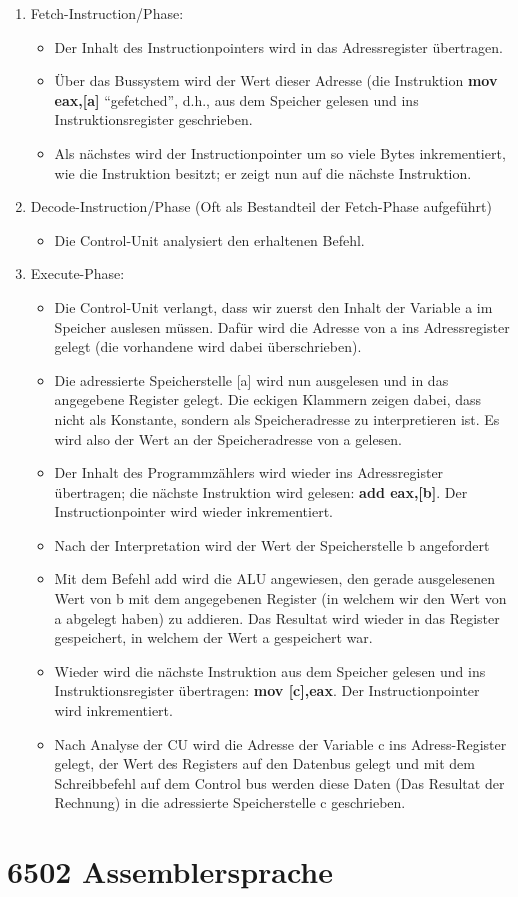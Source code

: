 \documentclass[a4paper,10pt]{report}
\begin{document}
\begin{enumerate}
	\item Fetch-Instruction/Phase:
	\begin{itemize}
		\item	Der Inhalt des Instructionpointers wird in das Adressregister übertragen. 
		\item Über das Bussystem wird der Wert dieser Adresse (die Instruktion \textbf{mov eax,[a]} "`gefetched"', d.h., aus dem Speicher gelesen und ins Instruktionsregister geschrieben.
		\item Als nächstes wird der Instructionpointer um so viele Bytes inkrementiert, wie die Instruktion besitzt; er zeigt nun auf die nächste Instruktion.
	\end{itemize}
 \item Decode-Instruction/Phase (Oft als Bestandteil der Fetch-Phase aufgeführt)
  \begin{itemize}	
		\item Die Control-Unit analysiert den erhaltenen Befehl.
	\end{itemize}
	\item Execute-Phase:
	\begin{itemize}	
		\item Die Control-Unit verlangt, dass wir zuerst den Inhalt der Variable a im Speicher auslesen müssen. Dafür wird die Adresse von a ins Adressregister gelegt (die vorhandene wird dabei überschrieben). 
		\item Die adressierte Speicherstelle [a] wird nun ausgelesen und in das angegebene Register gelegt. Die eckigen Klammern zeigen dabei, dass nicht als Konstante, sondern als Speicheradresse zu interpretieren ist. Es wird also der Wert an der Speicheradresse von a gelesen.
		\item Der Inhalt des Programmzählers wird wieder ins Adressregister übertragen; die nächste Instruktion wird gelesen: \textbf{add eax,[b]}. Der Instructionpointer wird wieder inkrementiert.
		\item Nach der Interpretation wird der Wert der Speicherstelle b angefordert
		\item Mit dem Befehl add wird die ALU angewiesen, den gerade ausgelesenen Wert von b mit dem angegebenen Register (in welchem wir den Wert von a abgelegt haben) zu addieren. Das Resultat wird wieder in das Register gespeichert, in welchem der Wert a gespeichert war.
		\item Wieder wird die nächste Instruktion aus dem Speicher gelesen und ins Instruktionsregister übertragen: \textbf{mov [c],eax}. Der Instructionpointer wird inkrementiert.
		\item Nach Analyse der CU wird die Adresse der Variable c ins Adress-Register gelegt, der Wert des Registers auf den Datenbus gelegt und mit dem Schreibbefehl auf dem Control bus werden diese Daten (Das Resultat der Rechnung) in die adressierte Speicherstelle c geschrieben.
	\end{itemize}
\end{enumerate}
\newpage\chapter{6502 Assemblersprache}
\end{document}
